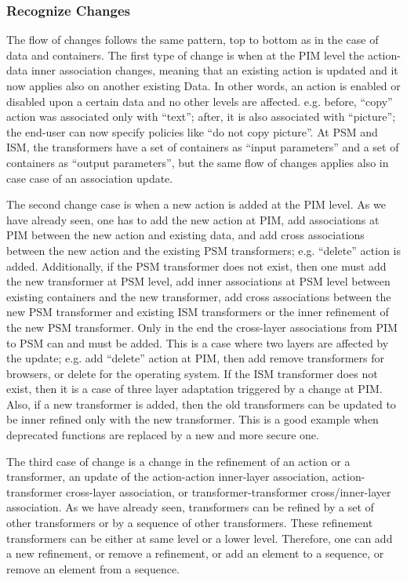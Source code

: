\documentclass{sig-alternate}
\begin{document}
\subsubsection{Recognize Changes}
The flow of changes follows the same pattern, top to bottom as in the case of data and containers.
The first type of change is when at the PIM level the action-data inner association changes, 
meaning that an existing action is updated and it now applies also on another existing Data.
In other words, an action is enabled or disabled upon a certain data and no other levels are affected.
e.g. before, ``copy'' action was associated only with ``text''; after, it is also associated with ``picture'';
the end-user can now specify policies like ``do not copy picture''. 
At PSM and ISM, the transformers have a set of containers as ``input parameters'' and a set of containers as ``output parameters'', 
but the same flow of changes applies also in case case of an association update. 

The second change case is when a new action is added at the PIM level.
As we have already seen, one has to add the new action at PIM, add associations at PIM between the new action and existing data,
and add cross associations between the new action and the existing PSM transformers; e.g. ``delete'' action is added.
Additionally, if the PSM transformer does not exist, then one must add the new transformer at PSM level,
add inner associations at PSM level between existing containers and the new transformer, 
add cross associations between the new PSM transformer and existing ISM transformers or the inner refinement of the new PSM transformer.
Only in the end the cross-layer associations from PIM to PSM can and must be added.
This is a case where two layers are affected by the update;
e.g. add ``delete'' action at PIM, then add remove transformers for browsers, or delete for the operating system.
If the ISM transformer does not exist, then it is a case of three layer adaptation triggered by a change at PIM.
Also, if a new transformer is added, then the old transformers can be updated to be inner refined only with the new transformer. 
This is a good example when deprecated functions are replaced by a new and more secure one. 

The third case of change is a change in the refinement of an action or a transformer, an update of the 
action-action inner-layer association, action-transformer cross-layer association, or transformer-transformer cross/inner-layer association.
As we have already seen, transformers can be refined by a set of other transformers or by a sequence of other transformers. 
These refinement transformers can be either at same level or a lower level. 
Therefore, one can add a new refinement, or remove a refinement,
or add an element to a sequence, or remove an element from a sequence.
\end{document}
